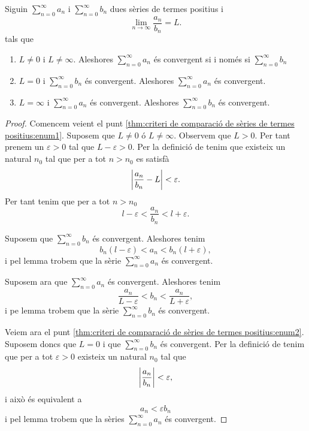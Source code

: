 \documentclass[../Apunts.tex]{subfiles}
\begin{document}
	\begin{theorem}
		\label{thm:criteri de comparació de sèries de termes positius}
		Siguin \(\sum_{n=0}^{\infty}a_{n}\) i \(\sum_{n=0}^{\infty}b_{n}\) dues sèries de termes positius i
		\[\lim_{n\to\infty}\frac{a_{n}}{b_{n}}=L.\]
		tals que
		\begin{enumerate}
			\item\label{thm:criteri de comparació de sèries de termes positius:enum1} \(L\neq0\) i \(L\neq\infty\). Aleshores \(\sum_{n=0}^{\infty}a_{n}\) és convergent si i només si \(\sum_{n=0}^{\infty}b_{n}\)
			\item\label{thm:criteri de comparació de sèries de termes positius:enum2} \(L=0\) i \(\sum_{n=0}^{\infty}b_{n}\) és convergent. Aleshores \(\sum_{n=0}^{\infty}a_{n}\) és convergent.
			\item\label{thm:criteri de comparació de sèries de termes positius:enum3} \(L=\infty\) i \(\sum_{n=0}^{\infty}a_{n}\) és convergent. Aleshores \(\sum_{n=0}^{\infty}b_{n}\) és convergent.
		\end{enumerate}
		\begin{proof}
			Comencem veient el punt \eqref{thm:criteri de comparació de sèries de termes positius:enum1}. Suposem que \(L\neq0\) ó \(L\neq\infty\). Observem que \(L>0\). Per tant prenem un \(\varepsilon>0\) tal que \(L-\varepsilon>0\). Per la definició de  tenim que existeix un natural \(n_{0}\) tal que per a tot \(n>n_{0}\) es satisfà
			\[\abs{\frac{a_{n}}{b_{n}}-L}<\varepsilon.\]
			Per tant tenim que per a tot \(n>n_{0}\)
			\[l-\varepsilon<\frac{a_{n}}{b_{n}}<l+\varepsilon.\]
			
			Suposem que \(\sum_{n=0}^{\infty}b_{n}\) és convergent. Aleshores tenim
			\[b_{n}(l-\varepsilon)<a_{n}<b_{n}(l+\varepsilon),\]
			i pel lemma  trobem que la sèrie \(\sum_{n=0}^{\infty}a_{n}\) és convergent.
			
			Suposem ara que \(\sum_{n=0}^{\infty}a_{n}\) és convergent. Aleshores tenim
			\[\frac{a_{n}}{L-\varepsilon}<b_{n}<\frac{a_{n}}{L+\varepsilon},\]
			i pe lemma  trobem que la sèrie \(\sum_{n=0}^{\infty}b_{n}\) és convergent.
			
			Veiem ara el punt \eqref{thm:criteri de comparació de sèries de termes positius:enum2}. Suposem doncs que \(L=0\) i que \(\sum_{n=0}^{\infty}b_{n}\) és convergent. Per la definició de  tenim que per a tot \(\varepsilon>0\) existeix un natural \(n_{0}\) tal que
			\[\abs{\frac{a_{n}}{b_{n}}}<\varepsilon,\]
			i això és equivalent a
			\[a_{n}<\varepsilon b_{n}\]
			i pel lemma  trobem que la sèries \(\sum_{n=0}^{\infty}a_{n}\) és convergent.
			

\end{proof}
\end{theorem}
\end{document}
